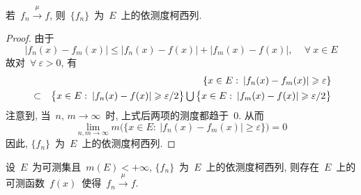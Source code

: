 \begin{remark}
若~$f_n \xrightarrow{~\mu~} f$, 则~$\{f_n\}$~为~$E$~上的依测度柯西列.
\end{remark}

\begin{proof}
由于
\[
|f_n(x) - f_m(x)| \leqslant |f_n(x) - f(x)| + |f_m(x) - f(x)|, \, \quad \forall~x \in E
\]
故对~$\forall~\varepsilon > 0$, 有
\begin{eqnarray*}
&& \{x \in E: \: |f_n(x) - f_m(x)| \geqslant \varepsilon\} \\
&\subset& \big\{x \in E: \: |f_n(x) - f(x)| \geqslant \varepsilon /2 \big\} \mathop{\textstyle{\bigcup}} \big\{x \in E: \: |f_m(x) - f(x)| \geqslant \varepsilon /2 \big\}
\end{eqnarray*}
注意到, 当~$n,\,m \to \infty$~时, 上式后两项的测度都趋于~$0$. 从而
\[
\lim_{n,m \to \infty} m\big(\{x \in E: \: |f_n(x) - f_m(x)| \geqslant \varepsilon\}\big) = 0
\]
因此, $\{f_n\}$~为~$E$~上的依测度柯西列.
\end{proof}

\begin{theorem}
设~$E$~为可测集且~$m(E) < +\infty$, $\{f_n\}$~为~$E$~上的依测度柯西列, 则存在~$E$~上的可测函数~$f(x)$~使得~$f_n \xrightarrow{~\mu~} f$.
\end{theorem}

